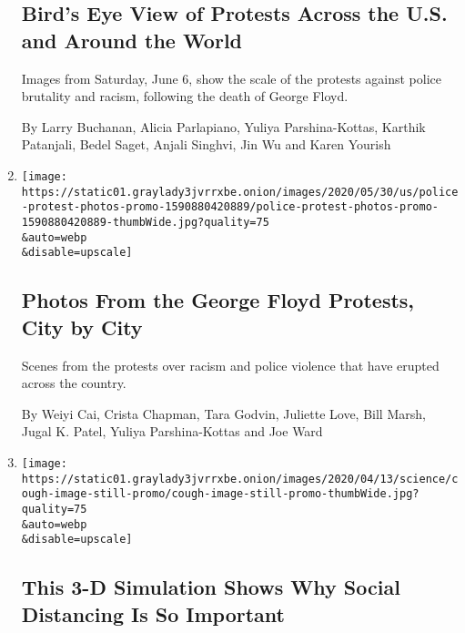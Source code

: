 \begin{enumerate}
  \hypertarget{birds-eye-view-of-protests-across-the-us-and-around-the-world}{%
  \subsection{Bird's Eye View of Protests Across the U.S. and Around the
  World}\label{birds-eye-view-of-protests-across-the-us-and-around-the-world}}

  Images from Saturday, June 6, show the scale of the protests against
  police brutality and racism, following the death of George Floyd.

  By Larry Buchanan, Alicia Parlapiano, Yuliya Parshina-Kottas, Karthik
  Patanjali, Bedel Saget, Anjali Singhvi, Jin Wu and Karen Yourish
\item
  \href{/interactive/2020/05/30/us/george-floyd-protest-photos.html}{}

  \texttt{[image: https://static01.graylady3jvrrxbe.onion/images/2020/05/30/us/police-protest-photos-promo-1590880420889/police-protest-photos-promo-1590880420889-thumbWide.jpg?quality=75\\\&auto=webp\\\&disable=upscale]}

  \hypertarget{photos-from-the-george-floyd-protests-city-by-city}{%
  \subsection{Photos From the George Floyd Protests, City by
  City}\label{photos-from-the-george-floyd-protests-city-by-city}}

  Scenes from the protests over racism and police violence that have
  erupted across the country.

  By Weiyi Cai, Crista Chapman, Tara Godvin, Juliette Love, Bill Marsh,
  Jugal K. Patel, Yuliya Parshina-Kottas and Joe Ward
\item
  \href{/interactive/2020/04/14/science/coronavirus-transmission-cough-6-feet-ar-ul.html}{}

  \texttt{[image: https://static01.graylady3jvrrxbe.onion/images/2020/04/13/science/cough-image-still-promo/cough-image-still-promo-thumbWide.jpg?quality=75\\\&auto=webp\\\&disable=upscale]}

  \hypertarget{this-3-d-simulation-shows-why-social-distancing-is-so-important}{%
  \subsection{This 3-D Simulation Shows Why Social Distancing Is So
  Important}\label{this-3-d-simulation-shows-why-social-distancing-is-so-important}}


\end{enumerate}
